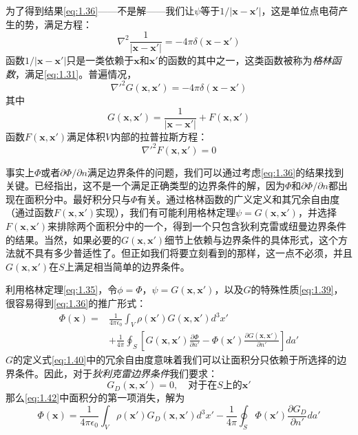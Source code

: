 \documentclass[12pt]{book}
\numberwithin{equation}{chapter}
\numberwithin{figure}{chapter}
\numberwithin{footnote}{page}
\begin{document}
为了得到结果\autoref{eq:1.36}——不是解——我们让$\psi$等于$1/|\mathbf{x}-\mathbf{x'}|$，这是单位点电荷产生的势，满足方程：
$$\nabla^2\frac{1}{|\mathbf{x}-\mathbf{x'}|}=-4\pi\delta(\mathbf{x}-\mathbf{x'})$$
函数$1/|\mathbf{x}-\mathbf{x'}|$只是一类依赖于$\mathbf{x}$和$\mathbf{x'}$的函数的其中之一，这类函数被称为\textit{格林函数}，满足\autoref{eq:1.31}。普遍情况，
\begin{equation}\label{eq:1.39}
    \nabla'^2G(\mathbf{x},\mathbf{x'})=-4\pi\delta(\mathbf{x}-\mathbf{x'})
\end{equation}
其中
\begin{equation}\label{eq:1.40}
    G(\mathbf{x},\mathbf{x'})=\frac{1}{|\mathbf{x}-\mathbf{x'}|}+F(\mathbf{x},\mathbf{x'})
\end{equation}
函数$F(\mathbf{x},\mathbf{x'})$满足体积$V$内部的拉普拉斯方程：
\begin{equation}\label{eq:1.41}
    \nabla'^2 F(\mathbf{x},\mathbf{x'})=0
\end{equation}

事实上$\Phi$或者$\partial \Phi/\partial n$满足边界条件的问题，我们可以通过考虑\autoref{eq:1.36}的结果找到关键。已经指出，这不是一个满足正确类型的边界条件的解，因为$\Phi$和$\partial \Phi/\partial n$都出现在面积分中。最好积分只与$\Phi$有关。通过格林函数的广义定义和其冗余自由度（通过函数$F(\mathbf{x},\mathbf{x'})$实现），我们有可能利用格林定理$\psi=G(\mathbf{x},\mathbf{x'})$，并选择$F(\mathbf{x},\mathbf{x'})$来排除两个面积分中的一个，得到一个只包含狄利克雷或纽曼边界条件的结果。当然，如果必要的$G(\mathbf{x},\mathbf{x'})$细节上依赖与边界条件的具体形式，这个方法就不具有多少普适性了。但正如我们将要立刻看到的那样，这一点不必须，并且$G(\mathbf{x},\mathbf{x'})$在$S$上满足相当简单的边界条件。

利用格林定理\autoref{eq:1.35}，令$\phi=\Phi$，$\psi=G(\mathbf{x},\mathbf{x'})$，以及$G$的特殊性质\autoref{eq:1.39}，很容易得到\autoref{eq:1.36}的推广形式：
\begin{equation}\label{eq:1.42}
\begin{aligned}
    \Phi(\mathbf{x})=&\frac{1}{4\pi\epsilon_0}\int_V \rho(\mathbf{x'})G(\mathbf{x},\mathbf{x'})d^3x'\\
    &+\frac{1}{4\pi}\oint_S [G(\mathbf{x},\mathbf{x'})\frac{\partial \Phi}{\partial n'}-\Phi(\mathbf{x'})\frac{\partial G(\mathbf{x},\mathbf{x'})}{\partial n'}]da'
    \end{aligned}
\end{equation}
$G$的定义式\autoref{eq:1.40}中的冗余自由度意味着我们可以让面积分只依赖于所选择的边界条件。因此，对于\textit{狄利克雷边界条件}我们要求：
\begin{equation}\label{eq:1.43}
    G_D(\mathbf{x},\mathbf{x'})=0, \quad \mbox{对于在}S\mbox{上的}\mathbf{x'}
\end{equation}
那么\autoref{eq:1.42}中面积分的第一项消失，解为
\begin{equation}\label{eq:1.44}
    \Phi(\mathbf{x})=\frac{1}{4\pi\epsilon_0}\int_V \rho(\mathbf{x'})G_D(\mathbf{x},\mathbf{x'})d^3x'-\frac{1}{4\pi}\oint_S \Phi(\mathbf{x'})\frac{\partial G_D}{\partial n'}da'
\end{equation}
\end{document}
